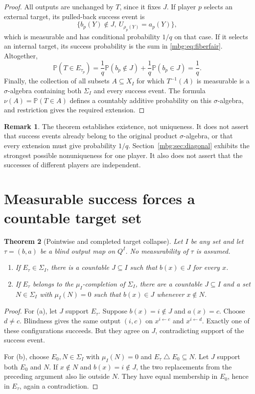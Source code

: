 \documentclass[11pt,letterpaper]{article}
\newtheorem{theorem}{Theorem}[section]
\theoremstyle{definition}
\newtheorem{remark}[theorem]{Remark}
\newcommand{\Prb}{\mathbb P}
\newcommand{\Sig}{\Sigma}
\begin{document}
\begin{proof}
All outputs are unchanged by $T$, since it fixes $J$. If player $p$ selects an external target, its pulled-back success event is
\[
 \{b_p(Y)\notin J,\ U_{\rho_p(Y)}=a_p(Y)\},
\]
which is measurable and has conditional probability $1/q$ on that case. If it selects an internal target, its success probability is the sum in \eqref{mbg:eq:fiberfair}. Altogether,
\[
 \Prb(T\in E_{\tau_p})=\frac1q\Prb(b_p\notin J)
                       +\frac1q\Prb(b_p\in J)=\frac1q.
\]
Finally, the collection of all subsets $A\subseteq X_I$ for which $T^{-1}(A)$ is measurable is a $\sigma$-algebra containing both $\Sig_I$ and every success event. The formula $\nu(A)=\Prb(T\in A)$ defines a countably additive probability on this $\sigma$-algebra, and restriction gives the required extension.
\end{proof}

\begin{remark}
The theorem establishes existence, not uniqueness. It does not assert that success events already belong to the original product $\sigma$-algebra, or that every extension must give probability $1/q$. Section~\ref{mbg:sec:diagonal} exhibits the strongest possible nonuniqueness for one player. It also does not assert that the successes of different players are independent.
\end{remark}

\section{Measurable success forces a countable target set}
\label{mbg:sec:collapse}

\begin{theorem}[Pointwise and completed target collapse]
\label{mbg:thm:collapse}
Let $I$ be any set and let $\tau=(b,a)$ be a blind output map on $Q^I$. No measurability of $\tau$ is assumed.
\begin{enumerate}[label=(\alph*)]
\item If $E_\tau\in\Sig_I$, there is a countable $J\subseteq I$ such that $b(x)\in J$ for every $x$.
\item If $E_\tau$ belongs to the $\mu_I$-completion of $\Sig_I$, there are a countable $J\subseteq I$ and a set $N\in\Sig_I$ with $\mu_I(N)=0$ such that $b(x)\in J$ whenever $x\notin N$.
\end{enumerate}
\end{theorem}
\begin{proof}
For (a), let $J$ support $E_\tau$. Suppose $b(x)=i\notin J$ and $a(x)=c$. Choose $d\ne c$. Blindness gives the same output $(i,c)$ on $x^{i\leftarrow c}$ and $x^{i\leftarrow d}$. Exactly one of these configurations succeeds. But they agree on $J$, contradicting support of the success event.

For (b), choose $E_0,N\in\Sig_I$ with $\mu_I(N)=0$ and $E_\tau\mathbin\triangle E_0\subseteq N$. Let $J$ support both $E_0$ and $N$. If $x\notin N$ and $b(x)=i\notin J$, the two replacements from the preceding argument also lie outside $N$. They have equal membership in $E_0$, hence in $E_\tau$, again a contradiction.
\end{proof}
\end{document}
